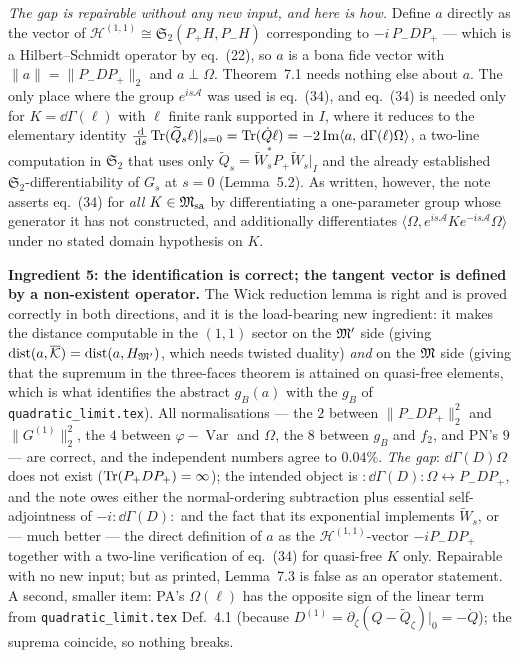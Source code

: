 \documentclass[11pt]{article}
\newcommand{\Wt}{\widetilde W}
\newcommand{\Pp}{P_+}\newcommand{\Pm}{P_-}
\providecommand{\Om}{\Omega}\providecommand{\Gm}{\Gamma}\providecommand{\Qt}{\widetilde Q}
\providecommand{\Msa}{\cM_{\mathrm{sa}}}\providecommand{\Mpsa}{\cM'_{\mathrm{sa}}}
\providecommand{\dist}{\operatorname{dist}}\providecommand{\Var}{\operatorname{Var}}
\providecommand{\Stwo}{\mathfrak S_2}\providecommand{\Sone}{\mathfrak S_1}
\providecommand{\norm}[1]{\lVert #1\rVert}\providecommand{\abs}[1]{\lvert #1\rvert}
\providecommand{\ip}[2]{\langle #1,#2\rangle}\providecommand{\one}{\mathbf 1}
\begin{document}
\emph{The gap is repairable without any new input, and here is how.}  Define $a$ directly as the
vector of $\mathcal H^{(1,1)}\cong\Stwo(\Pp H,\Pm H)$ corresponding to $-i\,\Pm D\Pp$ --- which is a
Hilbert--Schmidt operator by eq.~(22), so $a$ is a bona fide vector with
$\norm a=\norm{\Pm D\Pp}_2$ and $a\perp\Om$.  Theorem~7.1 needs nothing else about $a$.  The only
place where the group $e^{is\mathcal A}$ was used is eq.~(34), and eq.~(34) is needed only for
$K=\dd\Gm(\ell)$ with $\ell$ finite rank supported in $I$, where it reduces to the elementary
identity $\frac{\dd}{\dd s}\Tr(\Qt_s\ell)|_{s=0}=\Tr(\dot Q\ell)=-2\operatorname{Im}\ip a{\dd\Gm(\ell)
\Om}$, a two-line computation in $\Stwo$ that uses only $\Qt_s=\Wt_s^*\Pp\Wt_s|_I$ and the already
established $\Stwo$-differentiability of $G_s$ at $s=0$ (Lemma~5.2).  As written, however, the note
asserts eq.~(34) for \emph{all} $K\in\Msa$ by differentiating a one-parameter group whose generator
it has not constructed, and additionally differentiates $\ip\Om{e^{is\mathcal A}Ke^{-is\mathcal
A}\Om}$ under no stated domain hypothesis on $K$.

\begin{verdictgap}
\textbf{Ingredient 5: the identification is correct; the tangent vector is defined by a
non-existent operator.}  The Wick reduction lemma is right and is proved correctly in both
directions, and it is the load-bearing new ingredient: it makes the distance computable in the
$(1,1)$ sector on the $\mathfrak M'$ side (giving $\dist(a,\overline{\mathcal K})=\dist(a,H_{\cM'})$, which
needs twisted duality) \emph{and} on the $\mathfrak M$ side (giving that the supremum in the three-faces
theorem is attained on quasi-free elements, which is what identifies the abstract $g_B(a)$ with the
$g_B$ of \texttt{quadratic\_limit.tex}).  All normalisations --- the $2$ between $\norm{\Pm D\Pp}_2^2$
and $\norm{G^{(1)}}_2^2$, the $4$ between $\varphi-\Var$ and $\Omega$, the $8$ between $g_B$ and
$f_2$, and PN's $9$ --- are correct, and the independent numbers agree to $0.04\%$.  \emph{The gap}:
$\dd\Gm(D)\Om$ does not exist ($\Tr(\Pp D\Pp)=\infty$); the intended object is
$:\!\dd\Gm(D)\!:\Om\leftrightarrow\Pm D\Pp$, and the note owes either the normal-ordering
subtraction plus essential self-adjointness of $-i\!:\!\dd\Gm(D)\!:$ and the fact that its
exponential implements $\Wt_s$, or --- much better --- the direct definition of $a$ as the
$\mathcal H^{(1,1)}$-vector $-i\Pm D\Pp$ together with a two-line verification of eq.~(34) for
quasi-free $K$ only.  Repairable with no new input; but as printed, Lemma~7.3 is false as an
operator statement.  A second, smaller item: PA's $\Omega(\ell)$ has the opposite sign of the linear
term from \texttt{quadratic\_limit.tex} Def.~4.1 (because $D^{(1)}=\partial_\zeta(Q-\Qt_\zeta)|_0
=-\dot Q$); the suprema coincide, so nothing breaks.
\end{verdictgap}
\end{document}
